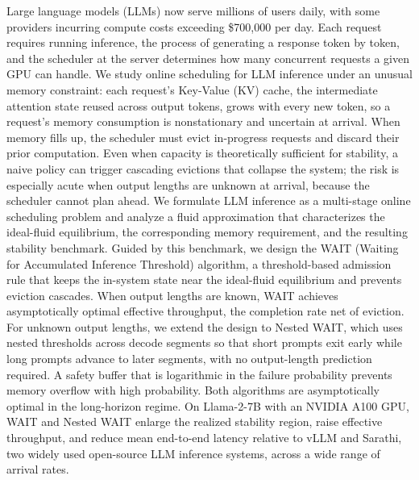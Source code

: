 Large language models (LLMs) now serve millions of users daily, with some providers incurring compute costs exceeding \$700{,}000 per day. Each request requires running inference, the process of generating a response token by token, and the scheduler at the server determines how many concurrent requests a given GPU can handle. We study online scheduling for LLM inference under an unusual memory constraint: each request's Key-Value (KV) cache, the intermediate attention state reused across output tokens, grows with every new token, so a request's memory consumption is nonstationary and uncertain at arrival. When memory fills up, the scheduler must evict in-progress requests and discard their prior computation. Even when capacity is theoretically sufficient for stability, a naive policy can trigger cascading evictions that collapse the system; the risk is especially acute when output lengths are unknown at arrival, because the scheduler cannot plan ahead. We formulate LLM inference as a multi-stage online scheduling problem and analyze a fluid approximation that characterizes the ideal-fluid equilibrium, the corresponding memory requirement, and the resulting stability benchmark. Guided by this benchmark, we design the WAIT (Waiting for Accumulated Inference Threshold) algorithm, a threshold-based admission rule that keeps the in-system state near the ideal-fluid equilibrium and prevents eviction cascades. When output lengths are known, WAIT achieves asymptotically optimal effective throughput, the completion rate net of eviction. For unknown output lengths, we extend the design to Nested WAIT, which uses nested thresholds across decode segments so that short prompts exit early while long prompts advance to later segments, with no output-length prediction required. A safety buffer that is logarithmic in the failure probability prevents memory overflow with high probability. Both algorithms are asymptotically optimal in the long-horizon regime. On Llama-2-7B with an NVIDIA A100 GPU, WAIT and Nested WAIT enlarge the realized stability region, raise effective throughput, and reduce mean end-to-end latency relative to vLLM and Sarathi, two widely used open-source LLM inference systems, across a wide range of arrival rates.
